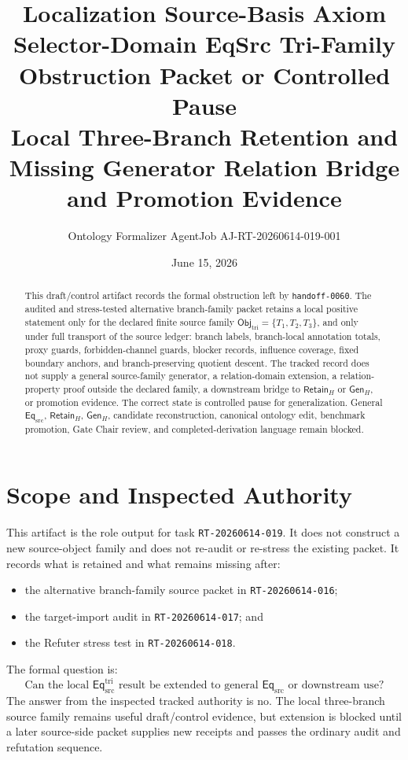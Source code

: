 \documentclass[11pt]{article}
\title{\textbf{Localization Source-Basis Axiom Selector-Domain EqSrc Tri-Family Obstruction Packet or Controlled Pause}\\[0.35em]
\large Local Three-Branch Retention and Missing Generator Relation Bridge and Promotion Evidence}
\author{Ontology Formalizer AgentJob AJ-RT-20260614-019-001}
\date{June 15, 2026}
\newcommand{\EqSrc}{\mathsf{Eq}_{\mathrm{src}}}
\newcommand{\EqTri}{\mathsf{Eq}_{\mathrm{src}}^{\mathrm{tri}}}
\newcommand{\ObjTri}{\mathsf{Obj}_{\mathrm{tri}}}
\newcommand{\RetainH}{\mathsf{Retain}_{H}}
\newcommand{\GenH}{\mathsf{Gen}_{H}}
\begin{document}
\maketitle

\begin{abstract}
This draft/control artifact records the formal obstruction left by
\texttt{handoff-0060}. The audited and stress-tested alternative
branch-family packet retains a local positive statement only for the
declared finite source family
\(\ObjTri=\{T_{1},T_{2},T_{3}\}\), and only under full transport of the
source ledger: branch labels, branch-local annotation totals, proxy
guards, forbidden-channel guards, blocker records, influence coverage,
fixed boundary anchors, and branch-preserving quotient descent. The
tracked record does not supply a general source-family generator, a
relation-domain extension, a relation-property proof outside the
declared family, a downstream bridge to \(\RetainH\) or \(\GenH\), or
promotion evidence. The correct state is controlled pause for
generalization. General \(\EqSrc\), \(\RetainH\), \(\GenH\), candidate
reconstruction, canonical ontology edit, benchmark promotion, Gate Chair
review, and completed-derivation language remain blocked.
\end{abstract}

\section{Scope and Inspected Authority}

This artifact is the role output for task \texttt{RT-20260614-019}. It
does not construct a new source-object family and does not re-audit or
re-stress the existing packet. It records what is retained and what
remains missing after:
\begin{itemize}
    \item the alternative branch-family source packet in
    \texttt{RT-20260614-016};
    \item the target-import audit in \texttt{RT-20260614-017}; and
    \item the Refuter stress test in \texttt{RT-20260614-018}.
\end{itemize}

The formal question is:
\[
    \text{Can the local }\EqTri\text{ result be extended to general }
    \EqSrc\text{ or downstream use?}
\]
The answer from the inspected tracked authority is no. The local
three-branch source family remains useful draft/control evidence, but
extension is blocked until a later source-side packet supplies new
receipts and passes the ordinary audit and refutation sequence.
\end{document}
